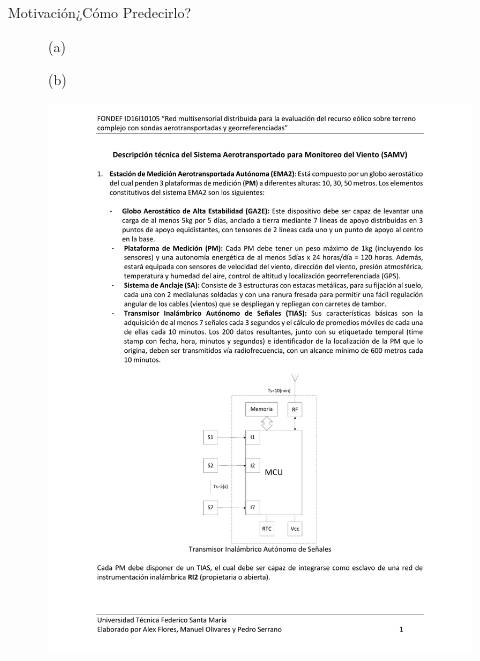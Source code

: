 \documentclass[mathserif,10pt]{beamer}
\begin{document}
\begin{frame}{Motivación}{¿Cómo Predecirlo?}
	\begin{figure}
		\begin{minipage}{0.5\linewidth}
			\centering
			(a)
		\end{minipage}%
		\begin{minipage}{0.5\linewidth}
			\centering
			(b)
		\end{minipage}%
		
		\begin{minipage}{0.5\linewidth}
			\centering
			\includegraphics[width=0.9\linewidth,page=3,trim={6cm 12.2cm 6cm 9.5cm},clip]{fig/01/descrp}
		\end{minipage}%
		\begin{minipage}{0.5\linewidth}
			\centering

\end{minipage}
\end{figure}
\end{frame}
\end{document}
